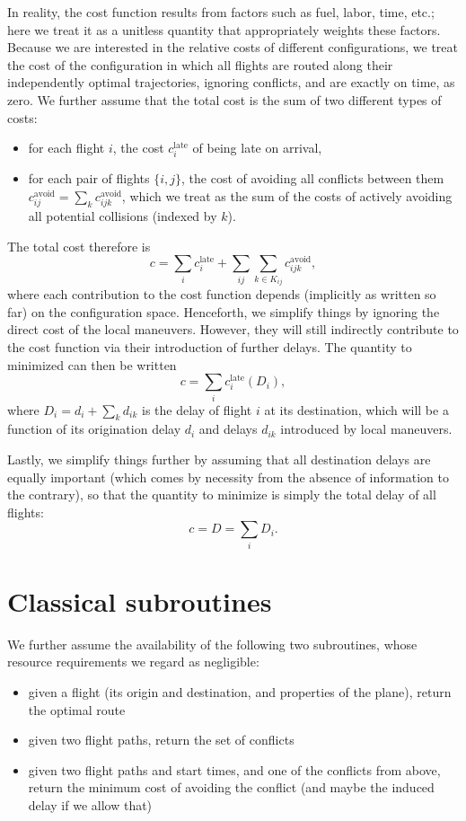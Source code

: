 \documentclass{article}
\begin{document}
In reality, the cost function results from factors such as fuel, labor, time, etc.; here we treat it as a unitless quantity that appropriately weights these factors.
Because we are interested in the relative costs of different configurations, we treat the cost of the configuration in which all flights are routed along their independently optimal trajectories, ignoring conflicts, and are exactly on time, as zero.
We further assume that the total cost is the sum of two different types of costs:
\begin{itemize}
  \item for each flight $i$, the cost $c_i^{\mathrm{late}}$ of being late on arrival,
  \item for each pair of flights $\{i, j\}$, the cost of avoiding all conflicts between them 
$c^{\mathrm{avoid}}_{ij} = \sum_{k} c^{\mathrm{avoid}}_{ijk}$, 
which we treat as the sum of the costs of actively avoiding all potential collisions (indexed by $k$).
\end{itemize}
The total cost therefore is 
\begin{equation*}
c = 
\sum_i c^{\mathrm{late}}_i + 
\sum_{ij} \sum_{k \in K_{ij}} c^{\mathrm{avoid}}_{ijk}
,
\end{equation*}
where each contribution to the cost function depends (implicitly as written so far) on the configuration space.
Henceforth, we simplify things by ignoring the direct cost of the local maneuvers. 
However, they will still indirectly contribute to the cost function via their introduction of further delays.
The quantity to minimized can then be written
\begin{equation*}
c = 
\sum_i c^{\mathrm{late}}_i (D_i),
\end{equation*}
where $D_i = d_i + \sum_k d_{ik}$ is the delay of flight $i$ at its destination, which will be a function of its origination delay $d_i$ and delays $d_{ik}$ introduced by local maneuvers.

Lastly, we simplify things further by assuming that all destination delays are equally important (which comes by necessity from the absence of information to the contrary), so that the quantity to minimize is simply the total delay of all flights:
\begin{equation*}
c = D = \sum_i D_i.
\end{equation*}

\section{Classical subroutines}
We further assume the availability of the following two subroutines, whose resource requirements we regard as negligible:
\begin{itemize}
\item given a flight (its origin and destination, and properties of the plane), return the optimal route
\item given two flight paths, return the set of conflicts
\item given two flight paths and start times, and one of the conflicts from above, return the minimum cost of avoiding the conflict (and maybe the induced delay if we allow that)
\end{itemize}
\end{document}
